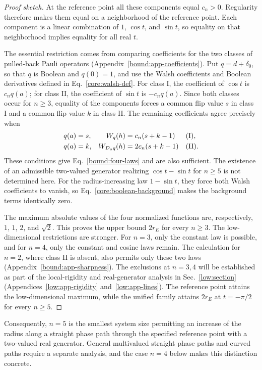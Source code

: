 \begin{proof}[Proof sketch]
At the reference point all these components equal $c_n>0$.
Regularity therefore makes them equal on a neighborhood of the reference point.  Each component is a linear combination of $1$, $\cos t$, and
$\sin t$, so equality on that neighborhood implies equality for all
real $t$.

The essential restriction comes from comparing coefficients for the two
classes of pulled-back Pauli operators (Appendix~\ref{bound:app-coefficients}).  Put $q=d+\delta_0$, so that
$q$ is Boolean and $q(0)=1$, and use the Walsh coefficients and Boolean
derivatives defined in Eq.~\eqref{core:walsh-def}.
For class I, the coefficient of $\cos t$ is $c_nq(a)$; for class II,
the coefficient of $\sin t$ is $-c_nq(a)$.  Since both classes occur
for $n\ge3$, equality of the components forces a common flip value
$s$ in class I and a common flip value $k$ in class II.  The remaining
coefficients agree precisely when
\begin{equation}
 \begin{aligned}
 q(a)&=s,& W_q(h)&=c_n(s+k-1)&&({\rm I}),\\
 q(a)&=k,& W_{D_aq}(h)&=2c_n(s+k-1)&&({\rm II}).
 \end{aligned}
 \label{bound:conditions}
\end{equation}
These conditions give Eq.~\eqref{bound:four-laws} and are also
sufficient. The existence of an admissible two-valued generator realizing $\cos t-\sin t$ for $n\ge5$ is not determined here.  For the radius-increasing law $1-\sin t$, they force both Walsh
coefficients to vanish, so Eq.~\eqref{core:boolean-background} makes the
background terms identically zero.

The maximum absolute values of the four normalized functions are,
respectively, $1$, $1$, $2$, and $\sqrt2$.  This proves the upper bound
$2r_E$ for every $n\ge3$.  The low-dimensional restrictions are stronger.
For $n=3$, only the constant law is possible, and for $n=4$, only the constant and cosine laws remain.
The calculation for $n=2$, where class II is absent,
also permits only these two laws (Appendix~\ref{bound:app-sharpness}). The exclusions at
$n=3,4$ will be established as part of the local-rigidity and real-generator
analysis in Sec.~\ref{low:section} (Appendices~\ref{low:app-rigidity} and~\ref{low:app-lines}).
The reference point attains the low-dimensional maximum, while the unified
family attains $2r_E$ at $t=-\pi/2$ for every $n\ge5$.
\end{proof}

Consequently, $n=5$ is the smallest system size permitting an
increase of the radius along a straight phase path through the specified reference point with a two-valued real generator. General multivalued straight phase paths
and curved paths require a separate analysis, and the case $n=4$ below
makes this distinction concrete.
